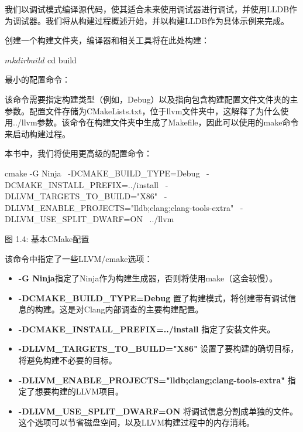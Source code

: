 

我们以调试模式编译源代码，使其适合未来使用调试器进行调试，并使用LLDB作为调试器。我们将从构建过程概述开始，并以构建LLDB作为具体示例来完成。


创建一个构建文件夹，编译器和相关工具将在此处构建：

\begin{shell}
$ mkdir build
$ cd build
\end{shell}

最小的配置命令：


该命令需要指定构建类型（例如，Debug）以及指向包含构建配置文件文件夹的主参数。配置文件存储为CMakeLists.txt，位于llvm文件夹中，这解释了为什么使用../llvm参数。该命令在构建文件夹中生成了Makefile，因此可以使用的make命令来启动构建过程。

本书中，我们将使用更高级的配置命令：

\begin{shell}
cmake -G Ninja \
  -DCMAKE_BUILD_TYPE=Debug \
  -DCMAKE_INSTALL_PREFIX=../install \
  -DLLVM_TARGETS_TO_BUILD="X86" \
  -DLLVM_ENABLE_PROJECTS="lldb;clang;clang-tools-extra" \
  -DLLVM_USE_SPLIT_DWARF=ON \
  ../llvm
\end{shell}

\begin{center}
图 1.4: 基本CMake配置
\end{center}

该命令中指定了一些LLVM/cmake选项：

\begin{itemize}
\item
\textbf{-G Ninja}指定了Ninja作为构建生成器，否则将使用make（这会较慢）。

\item
\textbf{-DCMAKE\_BUILD\_TYPE=Debug} 置了构建模式，将创建带有调试信息的构建。这是对Clang内部调查的主要构建配置。

\item
\textbf{-DCMAKE\_INSTALL\_PREFIX=../install} 指定了安装文件夹。

\item
\textbf{-DLLVM\_TARGETS\_TO\_BUILD="X86"} 设置了要构建的确切目标，将避免构建不必要的目标。

\item
\textbf{-DLLVM\_ENABLE\_PROJECTS="lldb;clang;clang-tools-extra"} 指定了想要构建的LLVM项目。

\item
\textbf{-DLLVM\_USE\_SPLIT\_DWARF=ON} 将调试信息分割成单独的文件。这个选项可以节省磁盘空间，以及LLVM构建过程中的内存消耗。
\end{itemize}

